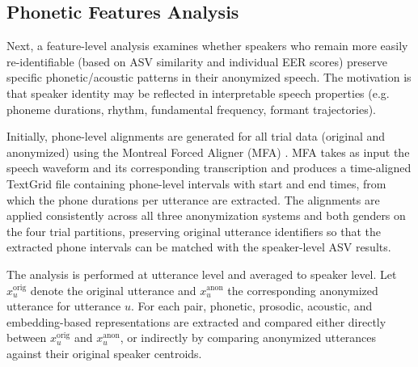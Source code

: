 \documentclass[12pt,leqno,a4paper]{article}
\begin{document}
\subsection{Phonetic Features Analysis}
\label{subsec:phonetic_features_analysis}

Next, a feature-level analysis examines whether speakers who remain more easily re-identifiable (based on ASV similarity and individual EER scores) preserve specific phonetic/acoustic patterns in their anonymized speech. 
The motivation is that speaker identity may be reflected in interpretable speech properties (e.g. phoneme durations, rhythm, fundamental frequency, formant trajectories). 

Initially, phone-level alignments are generated for all trial data (original and anonymized) using the Montreal Forced Aligner (MFA) \citep{mcauliffe17_interspeech}. 
MFA takes as input the speech waveform and its corresponding transcription and produces a time-aligned TextGrid file containing phone-level intervals with start and end times,
from which the phone durations per utterance are extracted. The alignments are applied consistently across all three anonymization systems and both genders on the four trial partitions, preserving original utterance identifiers so that the extracted phone intervals can be matched with the speaker-level ASV results. 

The analysis is performed at utterance level and averaged to speaker level. Let $x_{u}^{\mathrm{orig}}$ denote the original utterance and $x_{u}^{\mathrm{anon}}$ the corresponding anonymized utterance for utterance $u$. For each pair, phonetic, prosodic, acoustic, and embedding-based representations are extracted and compared either 
directly between $x_{u}^{\mathrm{orig}}$ and $x_{u}^{\mathrm{anon}}$, 
or indirectly by comparing anonymized utterances against their original 
speaker centroids. 
\end{document}
